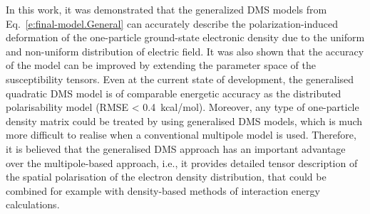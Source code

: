 \documentclass[aip,amsmath,amssymb,reprint,floatfix]{revtex4-1}
\begin{document}
%
In this work, it was demonstrated that the generalized DMS models from Eq.~\eqref{e:final-model.General}
can accurately describe the polarization\hyp{}induced deformation of the one\hyp{}particle ground\hyp{}state electronic density
due to the uniform and non\hyp{}uniform distribution of electric field.
It was also shown that the accuracy of the model can be improved by extending the parameter space of the susceptibility tensors.
Even at the current state of development, the generalised quadratic DMS model
is of comparable energetic accuracy as the distributed polarisability model (RMSE < 0.4~kcal/mol).
Moreover, any type of one\hyp{}particle density matrix could be treated by using
generalised DMS models, which is much more difficult to realise when a conventional multipole
model is used.
Therefore, it is believed that
the generalised DMS approach
has an important advantage over the multipole\hyp{}based approach, i.e., it provides detailed
tensor description of the spatial polarisation of the electron density distribution, that could be
combined for example with density\hyp{}based methods of interaction energy calculations.\cite{Mandado.Hermida-Ramon.JCTC.2011}
\end{document}
